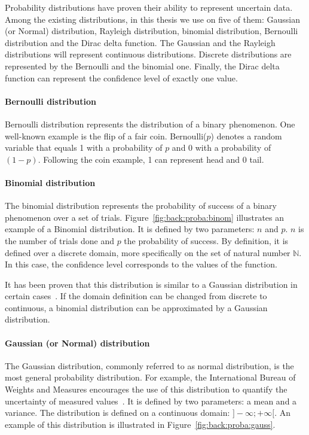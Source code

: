 Probability distributions have proven their ability to represent uncertain data.
Among the existing distributions, in this thesis we use on five of them: Gaussian (or Normal) distribution, Rayleigh distribution, binomial distribution, Bernoulli distribution and the Dirac delta function.
The Gaussian and the Rayleigh distributions will represent continuous distributions.
Discrete distributions are represented by the Bernoulli and the binomial one.
Finally, the Dirac delta function can represent the confidence level of exactly one value.

\paragraph{Bernoulli distribution}
Bernoulli distribution represents the distribution of a binary phenomenon.
One well-known example is the flip of a fair coin.
Bernoulli($p$) denotes a random variable that equals 1 with a probability of $p$ and 0 with a probability of $(1 - p)$.
Following the coin example, 1 can represent head and 0 tail.

\paragraph{Binomial distribution}
The binomial distribution represents the probability of success of a binary phenomenon over a set of trials.
Figure~\ref{fig:back:proba:binom} illustrates an example of a Binomial distribution.
It is defined by two parameters: $n$ and $p$.
$n$ is the number of trials done and $p$ the probability of success.
By definition, it is defined over a discrete domain, more specifically on the set of natural number $\mathds{N}$.
In this case, the confidence level corresponds to the values of the function.

It has been proven that this distribution is similar to a Gaussian distribution in certain cases~\cite{box2005}.
If the domain definition can be changed from discrete to continuous, a binomial distribution can be approximated by a Gaussian distribution. 

\paragraph{Gaussian (or Normal) distribution}
The Gaussian distribution, commonly referred to as normal distribution, is the most general probability distribution.
For example, the International Bureau of Weights and Measures encourages the use of this distribution to quantify the uncertainty of measured values~\cite{metrology2008evaluation}.
It is defined by two parameters: a mean and a variance.
The distribution is defined on a continuous domain: $]-\infty; +\infty[$.
An example of this distribution is illustrated in Figure~\ref{fig:back:proba:gauss}.

